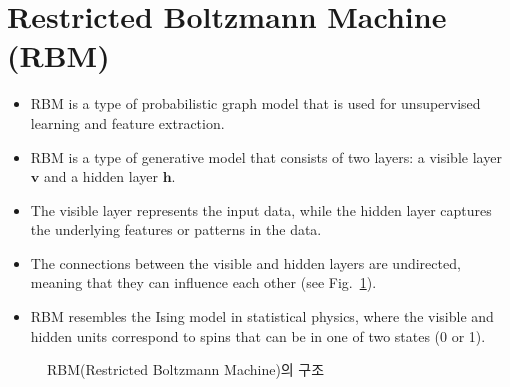 \documentclass[10pt, a4paper]{article}
\begin{document}
\section{Restricted Boltzmann Machine (RBM)}
\begin{itemize}
  \item RBM is a type of probabilistic graph model that is used for unsupervised learning
        and feature extraction.
  \item RBM is a type of generative model that consists of two layers:
        a visible layer $\mathbf{v}$ and a hidden layer $\mathbf{h}$.
  \item The visible layer represents the input data, while the hidden layer
        captures the underlying features or patterns in the data.
  \item The connections between the visible and hidden layers are undirected,
        meaning that they can influence each other (see Fig.~\ref{fig:rbm}).
  \item RBM resembles the Ising model in statistical physics, where the visible and hidden units
        correspond to spins that can be in one of two states (0 or 1).
\end{itemize}
%
\begin{figure}[H]
  \centering
  \caption{RBM(Restricted Boltzmann Machine)의 구조}
  \label{fig:rbm}
\end{figure}
\end{document}
